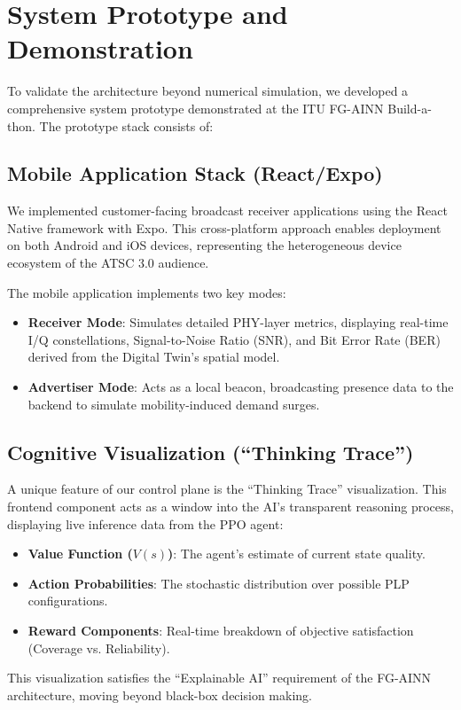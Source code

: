 \documentclass[conference]{IEEEtran}
\begin{document}
\section{System Prototype and Demonstration}

To validate the architecture beyond numerical simulation, we developed a comprehensive system prototype demonstrated at the ITU FG-AINN Build-a-thon. The prototype stack consists of:

\subsection{Mobile Application Stack (React/Expo)}
We implemented customer-facing broadcast receiver applications using the React Native framework with Expo. This cross-platform approach enables deployment on both Android and iOS devices, representing the heterogeneous device ecosystem of the ATSC 3.0 audience.

The mobile application implements two key modes:
\begin{itemize}
\item \textbf{Receiver Mode}: Simulates detailed PHY-layer metrics, displaying real-time I/Q constellations, Signal-to-Noise Ratio (SNR), and Bit Error Rate (BER) derived from the Digital Twin's spatial model.
\item \textbf{Advertiser Mode}: Acts as a local beacon, broadcasting presence data to the backend to simulate mobility-induced demand surges.
\end{itemize}

\subsection{Cognitive Visualization (``Thinking Trace'')}
A unique feature of our control plane is the ``Thinking Trace'' visualization. This frontend component acts as a window into the AI's transparent reasoning process, displaying live inference data from the PPO agent:
\begin{itemize}
\item \textbf{Value Function ($V(s)$)}: The agent's estimate of current state quality.
\item \textbf{Action Probabilities}: The stochastic distribution over possible PLP configurations.
\item \textbf{Reward Components}: Real-time breakdown of objective satisfaction (Coverage vs. Reliability).
\end{itemize}
This visualization satisfies the ``Explainable AI'' requirement of the FG-AINN architecture, moving beyond black-box decision making.
\end{document}
